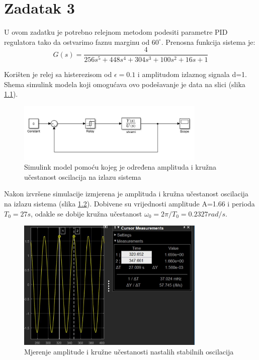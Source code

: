 \chapter{Zadatak 3}

U ovom zadatku je potrebno relejnom metodom podesiti parametre PID regulatora tako da ostvarimo faznu marginu od $60^{\circ}$. Prenosna funkcija sistema je:
	\[G(s)=\frac{4}{256s^5+448s^4+304s^3+100s^2+16s+1} \]

Korišten je relej sa histerezisom od $\epsilon=0.1$ i amplitudom izlaznog signala d=1. Shema simulink modela koji omogućava ovo podešavanje je data na slici (slika \ref{fig:z3_1}).

\begin{figure} [H]
  \centering
  \includegraphics[width=0.8\textwidth]{z3_1}
  \caption{Simulink model pomoću kojeg je određena amplituda i kružna učestanost oscilacija na izlazu sistema}
  \label{fig:z3_1}
\end{figure}
 
Nakon izvršene simulacije izmjerena je amplituda i kružna učestanost oscilacija na izlazu sistema (slika \ref{fig:z3_2}). Dobivene su vrijednosti amplitude A=1.66 i perioda $T_0=27s$, odakle se dobije kružna učestanost $\omega_0=2\pi/T_0 =0.2327 rad/s$.

\begin{figure} [H]
  \centering
  \includegraphics[width=0.8\textwidth]{z3_2}
  \caption{Mjerenje amplitude i kružne učestanosti nastalih stabilnih oscilacija}
  \label{fig:z3_2}
\end{figure}

